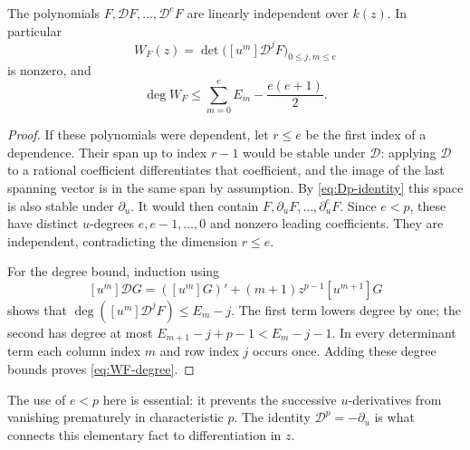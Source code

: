 \begin{lemma}\label{lem:D-cyclic}
The polynomials $F,\mathcal DF,\ldots,\mathcal D^eF$ are linearly independent
over $k(z)$. In particular
\begin{equation}\label{eq:WF-def}
 W_F(z)=\det\bigl([u^m]\mathcal D^jF\bigr)_{0\leq j,m\leq e}
\end{equation}
is nonzero, and
\begin{equation}\label{eq:WF-degree}
 \deg W_F\leq\sum_{m=0}^e E_m-\frac{e(e+1)}2.
\end{equation}
\end{lemma}
\begin{proof}
If these polynomials were dependent, let $r\leq e$ be the first index of a
dependence. Their span up to index $r-1$ would be stable under $\mathcal D$:
applying $\mathcal D$ to a rational coefficient differentiates that coefficient,
and the image of the last spanning vector is in the same span by assumption.
By \eqref{eq:Dp-identity} this space is also stable under $\partial_u$.
It would then contain
$F,\partial_uF,\ldots,\partial_u^eF$. Since $e<p$, these have distinct
$u$-degrees $e,e-1,\ldots,0$ and nonzero leading coefficients. They are
independent, contradicting the dimension $r\leq e$.

For the degree bound, induction using
\[
 [u^m]\mathcal DG=([u^m]G)' +(m+1)z^{p-1}[u^{m+1}]G
\]
shows that $\deg([u^m]\mathcal D^jF)\leq E_m-j$. The first term lowers
degree by one; the second has degree at most
$E_{m+1}-j+p-1<E_m-j-1$. In every determinant term each column index $m$
and row index $j$ occurs once. Adding these degree bounds proves
\eqref{eq:WF-degree}.
\end{proof}

The use of $e<p$ here is essential: it prevents the successive $u$-derivatives
from vanishing prematurely in characteristic $p$. The identity
$\mathcal D^p=-\partial_u$ is what connects this elementary fact to
differentiation in $z$.


